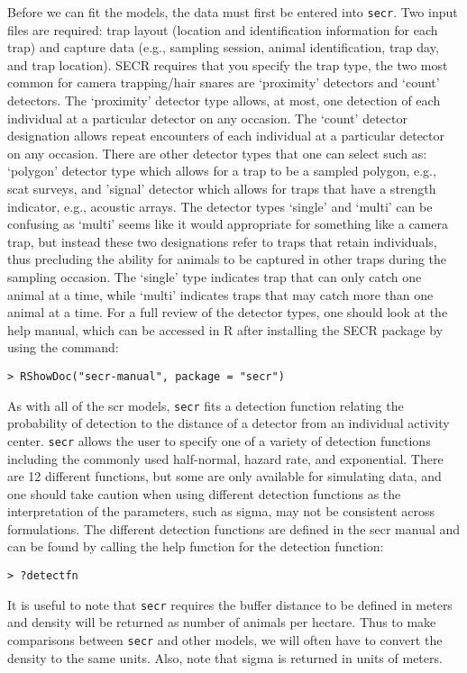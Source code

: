 Before we can fit the models, the data must first be entered into
\mbox{\tt secr}.  Two input files are required: trap layout (location and
identification information for each trap) and capture data (e.g.,
sampling session, animal identification, trap day, and trap location).
SECR requires that you specify the trap type, the two most common for
camera trapping/hair snares are ‘proximity’ detectors and ‘count’
detectors.  The `proximity' detector type allows, at most, one
detection of each individual at a particular detector on any occasion.
The ‘count’ detector designation allows repeat encounters of each
individual at a particular detector on any occasion.  There are other
detector types that one can select such as: `polygon' detector type
which allows for a trap to be a sampled polygon, e.g., scat surveys,
and 'signal' detector which allows for traps that have a strength
indicator, e.g., acoustic arrays.  The detector types ‘single’ and
‘multi’ can be confusing as ‘multi’ seems like it would appropriate
for something like a camera trap, but instead these two designations
refer to traps that retain individuals, thus precluding the ability
for animals to be captured in other traps during the sampling
occasion.  The ‘single’ type indicates trap that can only catch one
animal at a time, while ‘multi’ indicates traps that may catch more
than one animal at a time.  For a full review of the detector types,
one should look at the help manual, which can be accessed in R after
installing the SECR package by using the command:
\begin{verbatim}
> RShowDoc("secr-manual", package = "secr")
\end{verbatim}
As with all of the scr models, \mbox{\tt secr} fits a detection function relating
the probability of detection to the distance of a detector from an
individual activity center. \mbox{\tt secr} allows the user to specify one of a
variety of detection functions including the commonly used
half-normal, hazard rate, and exponential.  There are 12 different
functions, but some are only available for simulating data, and one
should take caution when using different detection functions as the
interpretation of the parameters, such as sigma, may not be consistent
across formulations.  The different detection functions are defined in
the secr manual and can be found by calling the help function for the
detection function:
\begin{verbatim}
> ?detectfn
\end{verbatim}
It is useful to note that \mbox{\tt secr} requires the buffer distance to be
defined in meters and density will be returned as number of animals
per hectare.  Thus to make comparisons between \mbox{\tt secr} and other models,
we will often have to convert the density to the same units.  Also,
note that sigma is returned in units of meters.

